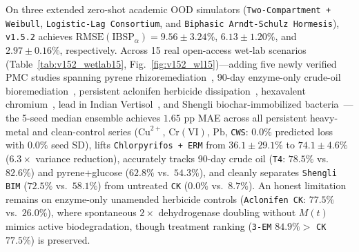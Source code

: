 \documentclass[10pt,twocolumn,a4paper]{article}
\begin{document}
On three extended zero-shot academic OOD simulators (\texttt{Two-Compartment + Weibull}, \texttt{Logistic-Lag Consortium}, and \texttt{Biphasic Arndt-Schulz Hormesis}), \texttt{v1.5.2} achieves $\text{RMSE}(\text{IBSP}_\alpha) = 9.56 \pm 3.24\%$, $6.13 \pm 1.20\%$, and $2.97 \pm 0.16\%$, respectively. Across 15 real open-access wet-lab scenarios (Table~\ref{tab:v152_wetlab15}, Fig.~\ref{fig:v152_wl15})---adding five newly verified PMC studies spanning pyrene rhizoremediation~\cite{lu2017pyrene}, 90-day enzyme-only crude-oil bioremediation~\cite{omenna2025crude}, persistent aclonifen herbicide dissipation~\cite{szpyrka2025aclonifen}, hexavalent chromium~\cite{wyszkowska2023cr}, lead in Indian Vertisol~\cite{dotaniya2023pb}, and Shengli biochar-immobilized bacteria~\cite{zhang2019shengli}---the 5-seed median ensemble achieves $1.65\text{ pp}$ MAE across all persistent heavy-metal and clean-control series ($\mathrm{Cu}^{2+}$, $\mathrm{Cr(VI)}$, $\mathrm{Pb}$, \texttt{CWS}: $0.0\%$ predicted loss with $0.0\%$ seed SD), lifts \texttt{Chlorpyrifos + ERM} from $36.1 \pm 29.1\%$ to $74.1 \pm 4.6\%$ ($6.3\times$ variance reduction), accurately tracks 90-day crude oil (\texttt{T4}: $78.5\%$ vs.\ $82.6\%$) and pyrene+glucose ($62.8\%$ vs.\ $54.3\%$), and cleanly separates \texttt{Shengli BIM} ($72.5\%$ vs.\ $58.1\%$) from untreated \texttt{CK} ($0.0\%$ vs.\ $8.7\%$). An honest limitation remains on enzyme-only unamended herbicide controls (\texttt{Aclonifen CK}: $77.5\%$ vs.\ $26.0\%$), where spontaneous $2\times$ dehydrogenase doubling without $M(t)$ mimics active biodegradation, though treatment ranking (\texttt{3-EM} $84.9\% >$ \texttt{CK} $77.5\%$) is preserved.
\end{document}
